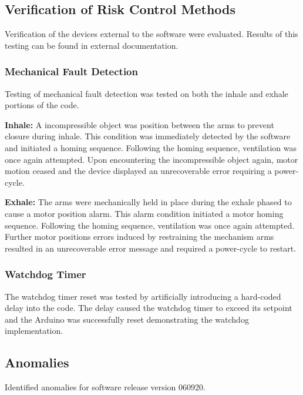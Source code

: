 \documentclass[]{article}
\begin{document}
\subsection{Verification of Risk Control Methods}
\label{sect:v_risk}

Verification of the devices external to the software were evaluated.  Results of this testing can be found in external documentation.

\subsubsection{Mechanical Fault Detection}
Testing of mechanical fault detection was tested on both the inhale and exhale portions of the code.

\noindent \textbf{Inhale:} A incompressible object was position between the arms to prevent closure during inhale. This condition was immediately detected by the software and initiated a homing sequence.  Following the homing sequence, ventilation was once again attempted.  Upon encountering the incompressible object again, motor motion ceased and the device displayed an unrecoverable error requiring a power-cycle.

\noindent \textbf{Exhale:} The arms were mechanically held in place during the exhale phased to cause a motor position alarm.  This alarm condition initiated a motor homing sequence. Following the homing sequence, ventilation was once again attempted.  Further motor positions errors induced by restraining the mechanism arms resulted in an unrecoverable error message and required a power-cycle to restart.

\subsubsection{Watchdog Timer}
The watchdog timer reset was tested by artificially introducing a hard-coded delay into the code.  The delay caused the watchdog timer to exceed its setpoint and the Arduino was successfully reset demonstrating the watchdog implementation.

\subsection{Anomalies}
\label{sect:anomalies}

Identified anomalies for software release version 060920.
\end{document}

